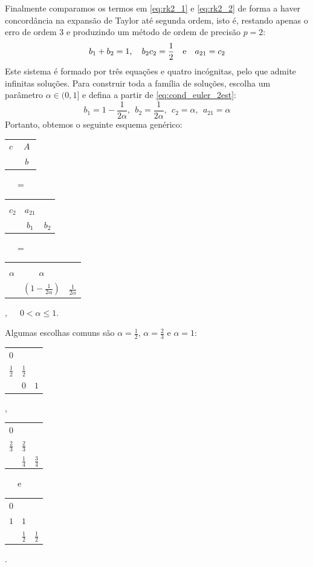 Finalmente comparamos os termos em \eqref{eq:rk2_1} e \eqref{eq:rk2_2} de forma a haver concordância na expansão de Taylor até segunda ordem, isto é, restando apenas o erro de ordem 3 e produzindo um método de ordem de precisão $p=2$:
\begin{equation}\label{eq:cond_euler_2est}
  b_1+b_2=1, \quad b_2c_2 = \frac{1}{2} \quad \hbox{e} \quad a_{21}=c_2
\end{equation}
Este sistema é formado por três equações e quatro incógnitas, pelo que admite infinitas soluções. Para construir toda a família de soluções, escolha um parâmetro $\alpha\in (0,1] $ e defina a partir de \eqref{eq:cond_euler_2est}:
\begin{equation} b_1=1-\frac{1}{2\alpha},~~b_2=\frac{1}{2\alpha},~~c_2=\alpha,~~a_{21}=\alpha  \end{equation}
Portanto, obtemos o seguinte esquema genérico:
\begin{center}
\begin{tabular}{c|cc}
  \multirow{2}{*}{$c$}    &  \multicolumn{2}{c}{\multirow{2}{*}{$A$}} 	     \\
                          &  \multicolumn{2}{c}{}                            \\
  \hline
                          & \multicolumn{2}{c}{$~~b~~$}
\end{tabular}
~~~=~~~
\begin{tabular}{c|cc}
   &   &   \\
  $c_2$ & $a_{21}$ &   \\  \hline
      & $b_1$ &$b_2$
\end{tabular}
~~~=~~~
\begin{tabular}{c|cc}
   &   &   \\
  $\alpha$ & $\alpha$ &   \\  \hline
      & $\left(1-\frac{1}{2\alpha}\right)$ &$\frac{1}{2\alpha}$
\end{tabular},~~~$0<\alpha\leq 1$.
\end{center}
 Algumas escolhas comuns são $\alpha=\frac{1}{2}$, $\alpha=\frac{2}{3}$ e $\alpha=1$:
\begin{center}
\begin{tabular}{c|cc}
  $0$ &     &   \\
  $\frac{1}{2}$ & $\frac{1}{2}$ &   \\  \hline
      & $0$ & $1$
\end{tabular},\hphantom{~~~e~~~}
\begin{tabular}{c|cc}
  $0$ &   &   \\
  $\frac{2}{3}$ & $\frac{2}{3}$ &   \\  \hline
    & $\frac{1}{4}$ & $\frac{3}{4}$
\end{tabular} ~~~e~~~
\begin{tabular}{c|cc}
  $0$ &   &   \\
  $1$ & $1$ &   \\  \hline
      & $\frac{1}{2}$ &$\frac{1}{2}$
\end{tabular}.
\end{center}
